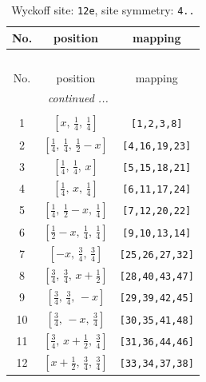 \documentclass[fleqn,8pt]{jsarticle}
\begin{document}
\begin{longtable}{ccc}
\caption{Wyckoff site: {\tt 12e}, site symmetry: {\tt 4..}}
 \\
 \hline \hline
No. & position & mapping \\ \hline \endfirsthead

\multicolumn{2}{l}{\tablename\ \thetable{}} \\
 \hline \hline
No. & position & mapping \\ \hline \endhead

 \hline \hline
\multicolumn{2}{r}{\footnotesize\it continued ...} \\ \endfoot

 \hline \hline
\multicolumn{2}{r}{} \\ \endlastfoot

1 & $\left[ x,\, \frac{1}{4},\, \frac{1}{4} \right]$ & {\tt [1,2,3,8]} \\ \hline
2 & $\left[ \frac{1}{4},\, \frac{1}{4},\, \frac{1}{2} - x \right]$ & {\tt [4,16,19,23]} \\ \hline
3 & $\left[ \frac{1}{4},\, \frac{1}{4},\, x \right]$ & {\tt [5,15,18,21]} \\ \hline
4 & $\left[ \frac{1}{4},\, x,\, \frac{1}{4} \right]$ & {\tt [6,11,17,24]} \\ \hline
5 & $\left[ \frac{1}{4},\, \frac{1}{2} - x,\, \frac{1}{4} \right]$ & {\tt [7,12,20,22]} \\ \hline
6 & $\left[ \frac{1}{2} - x,\, \frac{1}{4},\, \frac{1}{4} \right]$ & {\tt [9,10,13,14]} \\ \hline
7 & $\left[ - x,\, \frac{3}{4},\, \frac{3}{4} \right]$ & {\tt [25,26,27,32]} \\ \hline
8 & $\left[ \frac{3}{4},\, \frac{3}{4},\, x + \frac{1}{2} \right]$ & {\tt [28,40,43,47]} \\ \hline
9 & $\left[ \frac{3}{4},\, \frac{3}{4},\, - x \right]$ & {\tt [29,39,42,45]} \\ \hline
10 & $\left[ \frac{3}{4},\, - x,\, \frac{3}{4} \right]$ & {\tt [30,35,41,48]} \\ \hline
11 & $\left[ \frac{3}{4},\, x + \frac{1}{2},\, \frac{3}{4} \right]$ & {\tt [31,36,44,46]} \\ \hline
12 & $\left[ x + \frac{1}{2},\, \frac{3}{4},\, \frac{3}{4} \right]$ & {\tt [33,34,37,38]} \\
\end{longtable}
\renewcommand{\arraystretch}{1.2}
\end{document}
